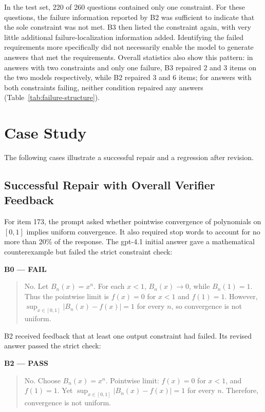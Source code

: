 \documentclass[conference]{IEEEtran}
\begin{document}
In the test set, 220 of 260 questions contained only one constraint. For these questions, the failure information reported by B2 was sufficient to indicate that the sole constraint was not met. B3 then listed the constraint again, with very little additional failure-localization information added. Identifying the failed requirements more specifically did not necessarily enable the model to generate answers that met the requirements. Overall statistics also show this pattern: in answers with two constraints and only one failure, B3 repaired 2 and 3 items on the two models respectively, while B2 repaired 3 and 6 items; for answers with both constraints failing, neither condition repaired any answers (Table~\ref{tab:failure-structure}).

\section{Case Study}
The following cases illustrate a successful repair and a regression after revision.
\subsection{Successful Repair with Overall Verifier Feedback}
For item 173, the prompt asked whether pointwise convergence of polynomials on \([0,1]\) implies uniform convergence. It also required stop words to account for no more than 20\% of the response. The gpt-4.1 initial answer gave a mathematical counterexample but failed the strict constraint check:

\noindent\textbf{B0 --- FAIL}
\begin{quote}
No. Let \(B_n(x)=x^n\). For each \(x<1\), \(B_n(x)\to0\), while \(B_n(1)=1\). Thus the pointwise limit is \(f(x)=0\) for \(x<1\) and \(f(1)=1\). However, \(\sup_{x\in[0,1]}|B_n(x)-f(x)|=1\) for every \(n\), so convergence is not uniform.
\end{quote}

B2 received feedback that at least one output constraint had failed. Its revised answer passed the strict check:

\begin{samepage}
\noindent\textbf{B2 --- PASS}
\begin{quote}
No. Choose \(B_n(x)=x^n\). Pointwise limit: \(f(x)=0\) for \(x<1\), and \(f(1)=1\). Yet \(\sup_{x\in[0,1]}|B_n(x)-f(x)|=1\) for every \(n\). Therefore, convergence is not uniform.
\end{quote}
\end{samepage}
\end{document}
